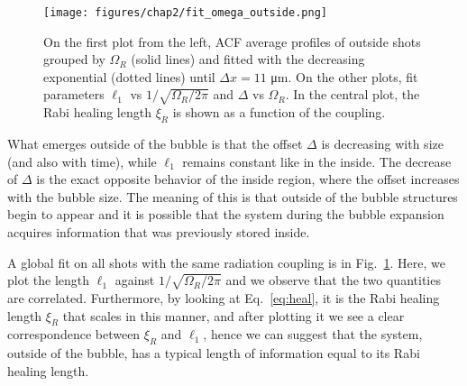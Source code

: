 \begin{figure}[ht!]
    \centering
    \texttt{[image: figures/chap2/fit\_omega\_outside.png]}
    \caption{On the first plot from the left, ACF average profiles of outside shots grouped by $\Omega_R$ (solid lines) and fitted with the decreasing exponential (dotted lines) until $\Delta x = 11$ \unit{\micro\meter}. On the other plots, fit parameters $\ell_1$ vs $1/\sqrt{\Omega_R/2\pi}$ and $\Delta$ vs $\Omega_R$. In the central plot, the Rabi healing length $\xi_R$ is shown as a function of the coupling.}
    \label{fig:fit_omega_outside}
\end{figure}
What emerges outside of the bubble is that the offset $\Delta$ is decreasing with size (and also with time), while $\ell_1$ remains constant like in the inside. The decrease of $\Delta$ is the exact opposite behavior of the inside region, where the offset increases with the bubble size. The meaning of this is that outside of the bubble structures begin to appear and it is possible that the system during the bubble expansion acquires information that was previously stored inside.

A global fit on all shots with the same radiation coupling is in Fig.\ \ref{fig:fit_omega_outside}. Here, we plot the length $\ell_1$ against $1/\sqrt{\Omega_R/2\pi}$ and we observe that the two quantities are correlated. Furthermore, by looking at Eq.\ \eqref{eq:heal}, it is the Rabi healing length $\xi_R$ that scales in this manner, and after plotting it we see a clear correspondence between $\xi_R$ and $\ell_1$, hence we can suggest that the system, outside of the bubble, has a typical length of information equal to its Rabi healing length.
